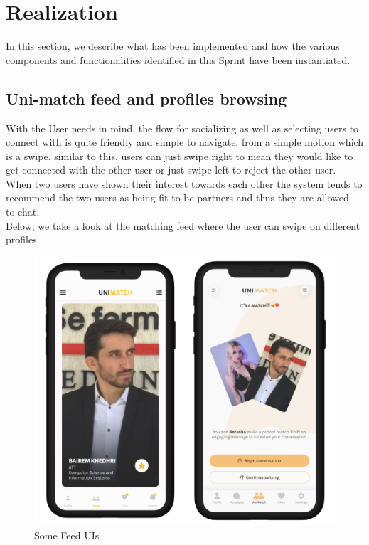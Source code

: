 \section{Realization}
In this section, we describe what has been implemented and how the various components and functionalities identified in this Sprint have been instantiated.

\subsection{Uni-match feed and profiles browsing}

With the User needs in mind, the flow for socializing as well as selecting users to connect with is quite friendly and simple to navigate. from a simple motion which is a swipe. similar to this, users can just swipe right to mean they would like to get connected with the other user or just swipe left to reject the other user. When two users have shown their interest towards each other the system tends to recommend the two users as being fit to be partners and thus they are allowed to-chat.\\

Below, we take a look at the matching feed where the user can swipe on different profiles. \\
\begin{figure}[H] 
            \centering
            \includegraphics[scale=0.2]{feed ui.png}
            \caption{Some Feed UIs} 
            \label{fig: Feed UI}
\end{figure}


